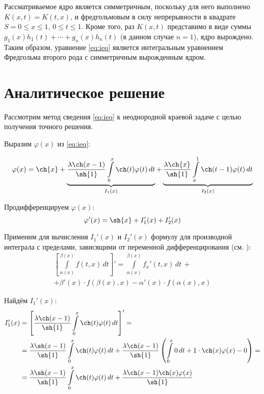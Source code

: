 \documentclass{article}
\numberwithin{equation}{section}
\renewcommand{\phi}{\varphi}
\renewcommand{\leq}{\leqslant}
\newcommand{\intl}{\int\limits}
\begin{document}
Рассматриваемое ядро является симметричным, поскольку для него
выполнено $K(x, t) = K(t, x)$, и фредгольмовым в силу непрерывности в
квадрате $S={0\leq x \leq 1,\, 0 \leq t \leq 1}$. Кроме того, раз
$K(x, t)$ представимо в виде суммы $g_1(x)h_1(t) + \dotsb + g_n(x)
h_n(t)$ (в данном случае $n=1$), ядро вырождено. Таким образом,
уравнение \eqref{eq:ieq} является интегральным уравнением Фредгольма
второго рода с симметричным вырожденным ядром.

\clearpage
\section{Аналитическое решение}
\label{sec:anal-solution}

Рассмотрим метод сведения \eqref{eq:ieq} к неоднородной краевой задаче
с целью получения точного решения.

Выразим $\phi(x)$ из \eqref{eq:ieq}:

\begin{equation}
  \label{eq:phi}
  \phi(x) = \ch{x} + 
  \underbrace{\frac{\lambda \ch(x-1)}{\sh{1}}\intl_0^x{\ch(t) \phi(t)\,dt}}_{I_1(x)} +
  \underbrace{\frac{\lambda \ch{x}}{\sh{1}}\intl_x^1{\ch(t-1)\phi(t)\,dt}}_{I_2(x)}
\end{equation}

Продифференцируем $\phi(x)$:
\begin{equation*}
  \phi'(x) = \sh{x} + I_1'(x) + I_2'(x)
\end{equation*}

Применим для вычисления $I_1'(x)$ и $I_2'(x)$ формулу для производной
интеграла с пределами, зависящими от переменной дифференцирования (см.
\cite{fikhtengolz03}):
\begin{multline}\label{eq:intdiff}
  \left [ \intl_{\alpha(x)}^{\beta(x)}{f(t, x)\,dt} \right ] ' = 
  \intl_{\alpha(x)}^{\beta(x)}{{f_x}'(t, x)\,dt}\, + \\
  + \beta'(x)\cdot f(\beta(x), x) -
  \alpha'(x)\cdot f(\alpha(x), x)
\end{multline}

Найдём $I_1'(x)$:
\begin{align*}
  I_1'(x) &= \left[ \frac{\lambda \ch(x-1)}{\sh{1}}\intl_0^x{\ch(t) \phi(t)\,dt} \right] ' = \\
  &= \frac{\lambda \sh(x-1)}{\sh{1}}\intl_0^x{\ch(t)\phi(t)\,dt} +
  \frac{\lambda \ch(x-1)}{\sh{1}} \left ( \intl_0^x{0\,dt} +
    1 \cdot \ch(x) \phi(x) - 0 \right) = \\
  &= \frac{\lambda \sh(x-1)}{\sh{1}}\intl_0^x{\ch(t)\phi(t)\,dt} +
  \frac{\lambda \ch(x-1) \ch(x) \phi(x)}{\sh{1}}    
\end{align*}
\end{document}
